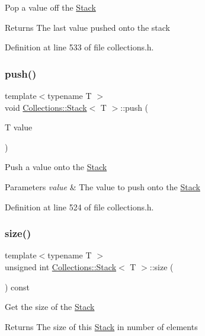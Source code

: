 Pop a value off the \hyperlink{class_collections_1_1_stack}{Stack} \begin{DoxyReturn}{Returns}
The last value pushed onto the stack 
\end{DoxyReturn}


Definition at line 533 of file collections.\+h.

\hypertarget{class_collections_1_1_stack_a649c37dc98fb39ce50febff978c7896e}{}\label{class_collections_1_1_stack_a649c37dc98fb39ce50febff978c7896e} 
\subsubsection{\texorpdfstring{push()}{push()}}
{\footnotesize\ttfamily template$<$typename T $>$ \\
void \hyperlink{class_collections_1_1_stack}{Collections\+::\+Stack}$<$ T $>$\+::push (\begin{DoxyParamCaption}\item[{T}]{value }\end{DoxyParamCaption})}

Push a value onto the \hyperlink{class_collections_1_1_stack}{Stack} 
\begin{DoxyParams}{Parameters}
{\em value} & The value to push onto the \hyperlink{class_collections_1_1_stack}{Stack} \\
\hline
\end{DoxyParams}


Definition at line 524 of file collections.\+h.

\hypertarget{class_collections_1_1_stack_a8f1d650e42694ba25d3d3aa7bb106178}{}\label{class_collections_1_1_stack_a8f1d650e42694ba25d3d3aa7bb106178} 
\subsubsection{\texorpdfstring{size()}{size()}}
{\footnotesize\ttfamily template$<$typename T $>$ \\
unsigned int \hyperlink{class_collections_1_1_stack}{Collections\+::\+Stack}$<$ T $>$\+::size (\begin{DoxyParamCaption}{ }\end{DoxyParamCaption}) const}

Get the size of the \hyperlink{class_collections_1_1_stack}{Stack} \begin{DoxyReturn}{Returns}
The size of this \hyperlink{class_collections_1_1_stack}{Stack} in number of elements 
\end{DoxyReturn}


